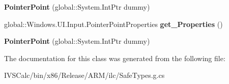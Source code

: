 \begin{DoxyCompactItemize}
\mbox{\label{class_windows_1_1_u_i_1_1_input_1_1_pointer_point_ae066090ae0399abeb3a964b540ab3bd4}} 
{\bfseries Pointer\+Point} (global\+::\+System.\+Int\+Ptr dummy)
\item 
\mbox{\label{class_windows_1_1_u_i_1_1_input_1_1_pointer_point_ad62db209242f432982245445ecc78851}} 
global\+::\+Windows.\+U\+I.\+Input.\+Pointer\+Point\+Properties {\bfseries get\+\_\+\+Properties} ()
\item 
\mbox{\label{class_windows_1_1_u_i_1_1_input_1_1_pointer_point_ae066090ae0399abeb3a964b540ab3bd4}} 
{\bfseries Pointer\+Point} (global\+::\+System.\+Int\+Ptr dummy)
\end{DoxyCompactItemize}


The documentation for this class was generated from the following file\+:\begin{DoxyCompactItemize}
\item 
I\+V\+S\+Calc/bin/x86/\+Release/\+A\+R\+M/ilc/Safe\+Types.\+g.\+cs\end{DoxyCompactItemize}
